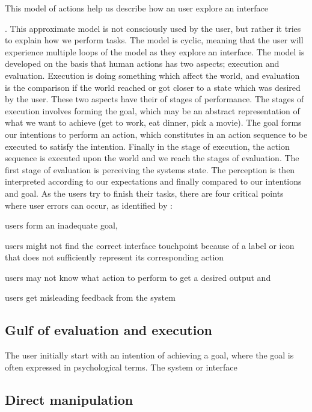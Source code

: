 This model of actions help us describe how an user explore an interface \cite{}. This approximate model \cite{Norman2013a} is not consciously used by the user, but rather it tries to explain how we perform tasks. The model is cyclic, meaning that the user will experience multiple loops of the model as they explore an interface. The model is developed on the basis that human actions has two aspects; execution and evaluation. Execution is doing something which affect the world, and evaluation is the comparison if the world reached or got closer to a state which was desired by the user. These two aspects have their of stages of performance. The stages of execution involves forming the goal, which may be an abstract representation of what we want to achieve (get to work, eat dinner, pick a movie). The goal forms our intentions to perform an action, which constitutes in an action sequence to be executed to satisfy the intention. Finally in the stage of execution, the action sequence is executed upon the world and we reach the stages of evaluation. The first stage of evaluation is perceiving the systems state. The perception is then interpreted according to our expectations and finally compared to our intentions and goal. As the users try to finish their tasks, there are four critical points where user errors can occur, as identified by \cite{Shneiderman2004}:
\begin{enumerate*}
  \item users form an inadequate goal,
  \item users might not find the correct interface touchpoint because of a label or icon that does not sufficiently represent its corresponding action
  \item users may not know what action to perform to get a desired output and
  \item users get misleading feedback from the system
\end{enumerate*}


\subsection{Gulf of evaluation and execution}
The user initially start with an intention of achieving a goal, where the goal is often expressed in psychological terms. The system or interface

\subsection{Direct manipulation}

